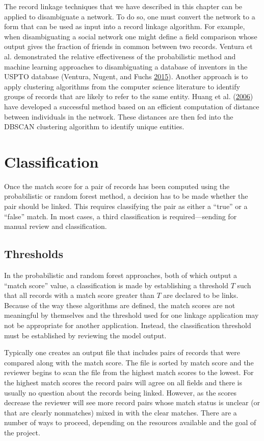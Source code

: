 \documentclass[]{krantz}
\begin{document}
The record linkage techniques that we have described in this chapter can
be applied to disambiguate a network. To do so, one must convert the
network to a form that can be used as input into a record linkage
algorithm. For example, when disambiguating a social network one might
define a field comparison whose output gives the fraction of friends in
common between two records. Ventura et al. demonstrated the relative
effectiveness of the probabilistic method and machine learning
approaches to disambiguating a database of inventors in the USPTO
database (Ventura, Nugent, and Fuchs
\protect\hyperlink{ref-ventura2015seeing}{2015}). Another approach is to
apply clustering algorithms from the computer science literature to
identify groups of records that are likely to refer to the same entity.
Huang et al. (\protect\hyperlink{ref-HEG06}{2006}) have developed a
successful method based on an efficient computation of distance between
individuals in the network. These distances are then fed into the DBSCAN
clustering algorithm to identify unique entities.

\section{Classification}\label{classification}

Once the match score for a pair of records has been computed using the
probabilistic or random forest method, a decision has to be made whether
the pair should be linked. This requires classifying the pair as either
a ``true'' or a ``false'' match. In most cases, a third classification
is required---sending for manual review and classification.

\subsection{Thresholds}\label{S:thresholds}

In the probabilistic and random forest approaches, both of which output
a ``match score'' value, a classification is made by establishing a
threshold \(T\) such that all records with a match score greater than
\(T\) are declared to be links. Because of the way these algorithms are
defined, the match scores are not meaningful by themselves and the
threshold used for one linkage application may not be appropriate for
another application. Instead, the classification threshold must be
established by reviewing the model output.

Typically one creates an output file that includes pairs of records that
were compared along with the match score. The file is sorted by match
score and the reviewer begins to scan the file from the highest match
scores to the lowest. For the highest match scores the record pairs will
agree on all fields and there is usually no question about the records
being linked. However, as the scores decrease the reviewer will see more
record pairs whose match status is unclear (or that are clearly
nonmatches) mixed in with the clear matches. There are a number of ways
to proceed, depending on the resources available and the goal of the
project.
\end{document}
